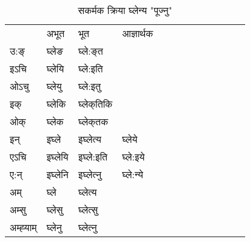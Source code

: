 \begin{table}[H]
\centering
\caption{\label{e.vt} सकर्मक क्रिया  घ्लेन्य  "पूज्नु"  }
\begin{tabular}{l|l|l|l|l|l|l|l|l|l|l|l|l}  \toprule
&अभूत & भूत & आज्ञार्थक \\ 
उ:ङ्‌ &घ्लेङ &घ्ले:ङ्‌त \\ 
इऽचि &घ्लेयि &घ्ले:इति   \\ 
ओऽचु &घ्लेयु &घ्ले:इतु   \\ 
इक् &घ्लेकि &घ्लेक्‌तिकि   \\ 
ओक् &घ्लेक &घ्लेक्‌तक   \\ 
इन् & इघ्ले & इघ्लेत्य &घ्लेये  \\ 
एऽचि & इघ्लेयि & इघ्ले:इति &घ्ले:इये    \\ 
ए:न् & इघ्लेनि  & इघ्लेत्‍नु &घ्ले:न्ये  \\ 
अम् & घ्ले & घ्लेत्य   \\ 
अम्सु & घ्लेसु & घ्लेत्सु     \\ 
अम्ह्‍याम् & घ्लेनु  & घ्लेत्‍नु \\ 
\bottomrule
\end{tabular}
\end{table}


